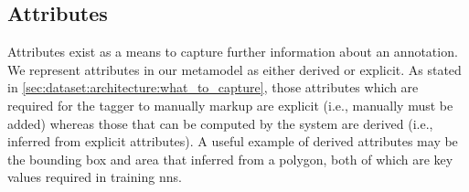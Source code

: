 \subsection{Attributes}

Attributes exist as a means to capture further information about an annotation. We represent attributes in our metamodel as either derived or explicit. As stated in \cref{sec:dataset:architecture:what_to_capture}, those attributes which are required for the tagger to manually markup are explicit (i.e., manually must be added) whereas those that can be computed by the system are derived (i.e., inferred from explicit attributes). A useful example of derived attributes may be the bounding box and area that inferred from a polygon, both of which are key values required in training \glspl{nn}.